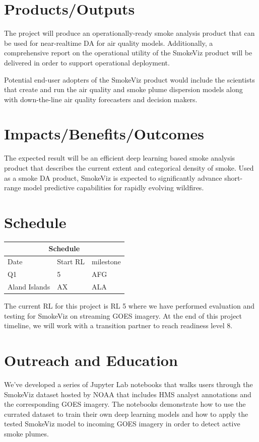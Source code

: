 \section{Products/Outputs}
The project will produce an operationally-ready smoke analysis product that can be used for near-realtime DA for air quality models. Additionally, a comprehensive report on the operational utility of the SmokeViz product will be delivered in order to support operational deployment.

Potential end-user adopters of the SmokeViz product would include the scientists that create and run the air quality and smoke plume dispersion models along with down-the-line air quality forecasters and decision makers.

\section{Impacts/Benefits/Outcomes}

The expected result will be an efficient deep learning based smoke analysis product that describes the current extent and categorical density of smoke. Used as a smoke DA product, SmokeViz is expected to significantly advance short-range model predictive capabilities for rapidly evolving wildfires.

\section{Schedule}

\begin{tabular}{ |p{3cm}|p{3cm}|p{8cm}|  }
 \hline
 \multicolumn{3}{|c|}{Schedule} \\
 \hline
 Date & Start RL & milestone\\
 \hline
 Q1 & 5 &AFG\\
 Aland Islands&   AX  & ALA   \\
 \hline
\end{tabular}

The current RL for this project is RL 5 where we have performed evaluation and testing for SmokeViz on streaming GOES imagery. At the end of this project timeline, we will work with a transition partner to reach readiness level 8.

\section{Outreach and Education}

We've developed a series of Jupyter Lab notebooks that walks users through the SmokeViz dataset hosted by NOAA that includes HMS analyst annotations and the corresponding GOES imagery. The notebooks demonstrate how to use the currated dataset to train their own deep learning models and how to apply the tested SmokeViz model to incoming GOES imagery in order to detect active smoke plumes.

